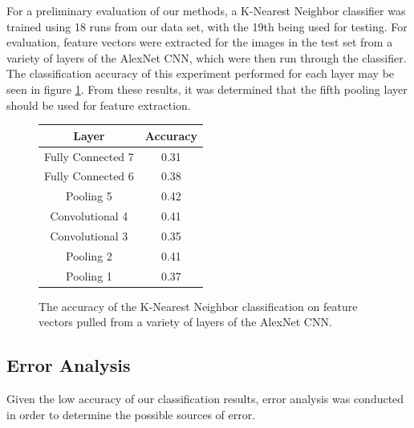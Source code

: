 \documentclass[letterpaper, 12 pt, conference]{ieeeconf}  %
\begin{document}
For a preliminary evaluation of our methods, a K-Nearest Neighbor classifier was trained using 18 runs from our data set, with the 19th being used for testing. For evaluation, feature vectors were extracted for the images in the test set from a variety of layers of the AlexNet CNN, which were then run through the classifier. The classification accuracy of this experiment performed for each layer may be seen in figure \ref{classification_results}. From these results, it was determined that the fifth pooling layer should be used for feature extraction.  

\begin{figure}[h]
\centering
\begin{tabular}{| c | c |}
\hline
\textbf{Layer} & \textbf{Accuracy} \\
\hline
Fully Connected 7 & 0.31 \\ 
Fully Connected 6 & 0.38 \\
Pooling 5 & 0.42 \\
Convolutional 4 & 0.41 \\
Convolutional 3 & 0.35 \\
Pooling 2 & 0.41 \\
Pooling 1 & 0.37 \\
\hline
\end{tabular}
\caption{The accuracy of the K-Nearest Neighbor classification on feature vectors pulled from a variety of layers of the AlexNet CNN. }
\label{classification_results}
\end{figure}

\subsection{Error Analysis}

Given the low accuracy of our classification results, error analysis was conducted in order to determine the possible sources of error. 
\end{document}
